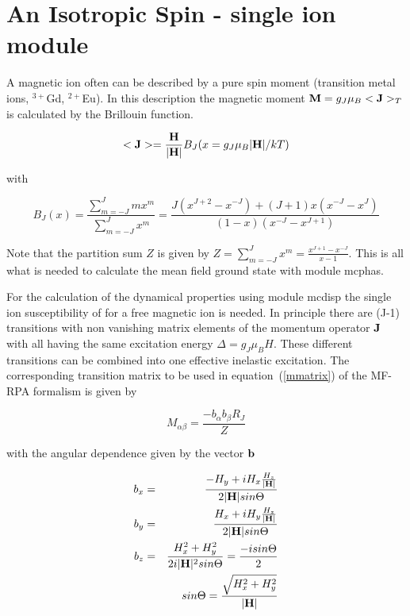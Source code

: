 \newpage
\section{An Isotropic Spin - single ion module}\label{brillouin}

A magnetic ion often can be described by a pure spin moment (transition
metal ions, $^{3+}$Gd, $^{2+}$Eu). In this description the magnetic moment
${\mathbf M}=g_J \mu_B <{\mathbf J}>_T$ is calculated by the Brillouin function. 

\begin{equation}
<\mathbf J>=\frac{\mathbf H}{|\mathbf H|} B_{J}(x=g_J \mu_B |\mathbf H|/kT)
\end{equation}

with

\begin{equation}
B_J(x)=\frac{\sum_{m=-J}^{J} m x^m}{\sum_{m=-J}^{J}  x^m}=
\frac{J(x^{J+2}-x^{-J})+(J+1)x(x^{-J}-x^J)}{(1-x)(x^{-J}-x^{J+1})}
\end{equation}

Note that the partition sum $Z$ is given by $Z=\sum_{m=-J}^{J}  x^m=\frac{x^{J+1}-x^{-J}}{x-1}$.
This is all what is needed to calculate the mean field ground state with 
module {\prg mcphas}.

For the calculation of the dynamical properties using module {\prg mcdisp}
the single ion susceptibility of for a free magnetic ion is needed. In principle
there are (J-1) transitions with non vanishing matrix elements of
the momentum operator $\mathbf J$ with all having the same
 excitation energy $\Delta=g_J \mu_B H$.
 These different transitions can
be combined into one effective inelastic excitation. The corresponding
transition matrix to be used in equation~(\ref{mmatrix}) of the MF-RPA formalism
is given by 

\begin{equation}
M_{\alpha\beta}=\frac{-b_{\alpha}b_{\beta}R_J}{Z}
\end{equation}

with the angular dependence given by the vector $\mathbf b$

\begin{eqnarray}
b_x& = & \frac{-H_y+i H_x \frac{H_z}{|\mathbf H|}}{2|\mathbf H| sin\Theta} \\
b_y& = & \frac{H_x+i H_y \frac{H_z}{|\mathbf H|}}{2|\mathbf H| sin\Theta} \\
b_z& = & \frac{H_x^2+H_y^2}{2i|\mathbf H|^2 sin\Theta}=\frac{-isin\Theta}{2} \\
&&sin\Theta=\frac{\sqrt{H_x^2+H_y^2}}{|\mathbf H|}
\end{eqnarray}

